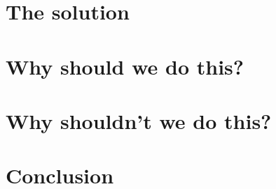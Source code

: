\documentclass[12pt]{amsart}
\begin{document}
    \section{The solution}\label{sec:the-solution}
    


    \section{Why should we do this?}\label{sec:why-should-we-do-this?}
    


    \section{Why shouldn't we do this?}\label{sec:why-shouldn't-we-do-this?}
    


    \section{Conclusion}\label{sec:conclusion}
    

    {}
    
\end{document}
